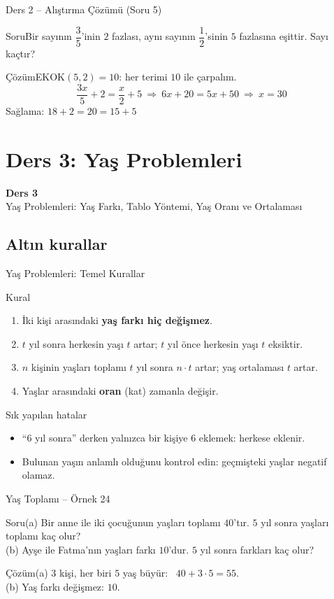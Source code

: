 \documentclass[aspectratio=169,11pt]{beamer}
\newcommand{\soru}[3]{%
\begin{frame}{#1}
  \begin{block}{Soru}\large #2\end{block}
  \pause
  \begin{exampleblock}{Çözüm}\large #3\end{exampleblock}
\end{frame}}
\begin{document}
\soru{Ders 2 -- Alıştırma Çözümü (Soru 5)}
{Bir sayının \(\dfrac{3}{5}\)'inin \(2\) fazlası, aynı sayının \(\dfrac{1}{2}\)'sinin \(5\) fazlasına eşittir. Sayı kaçtır?}
{EKOK\((5,2)=10\): her terimi \(10\) ile çarpalım.
\[\frac{3x}{5}+2=\frac{x}{2}+5\ \Rightarrow\ 6x+20=5x+50\ \Rightarrow\ x=30\]
Sağlama: \(18+2=20=15+5\) \checkmark}


\section{Ders 3: Yaş Problemleri}
\begin{frame}
\centering\Large\color{anamavi}\textbf{Ders 3}\\[6pt]\normalsize Yaş Problemleri: Yaş Farkı, Tablo Yöntemi, Yaş Oranı ve Ortalaması
\end{frame}

\subsection{Altın kurallar}
\begin{frame}{Yaş Problemleri: Temel Kurallar}
\begin{block}{Kural}
\begin{enumerate}
\item İki kişi arasındaki \textbf{yaş farkı hiç değişmez}.
\item \(t\) yıl sonra herkesin yaşı \(t\) artar; \(t\) yıl önce herkesin yaşı \(t\) eksiktir.
\item \(n\) kişinin yaşları toplamı \(t\) yıl sonra \(n\cdot t\) artar; yaş ortalaması \(t\) artar.
\item Yaşlar arasındaki \textbf{oran} (kat) zamanla değişir.
\end{enumerate}
\end{block}
\begin{alertblock}{Sık yapılan hatalar}
\begin{itemize}
\item ``\(6\) yıl sonra'' derken yalnızca bir kişiye \(6\) eklemek: herkese eklenir.
\item Bulunan yaşın anlamlı olduğunu kontrol edin: geçmişteki yaşlar negatif olamaz.
\end{itemize}
\end{alertblock}
\end{frame}

\soru{Yaş Toplamı -- Örnek 24}
{(a) Bir anne ile iki çocuğunun yaşları toplamı \(40\)'tır. \(5\) yıl sonra yaşları toplamı kaç olur?\\
(b) Ayşe ile Fatma'nın yaşları farkı \(10\)'dur. \(5\) yıl sonra farkları kaç olur?}
{(a) \(3\) kişi, her biri \(5\) yaş büyür: \ \(40+3\cdot 5=55\).\\[4pt]
(b) Yaş farkı değişmez: \(10\).}
\end{document}
